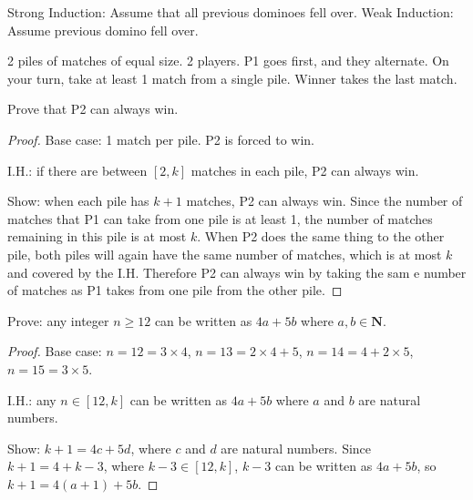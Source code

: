 \begin{remark}

Strong Induction: Assume that all previous dominoes fell over. Weak Induction: Assume previous domino fell over.

\end{remark}

\begin{prob}

2 piles of matches of equal size. 2 players. P1 goes first, and they alternate. On your turn, take at least 1 match from a single pile. Winner takes the last match.

Prove that P2 can always win.

\end{prob}

\begin{proof}

Base case: 1 match per pile. P2 is forced to win.

I.H.: if there are between $[2, k]$ matches in each pile, P2 can always win.

Show: when each pile has $k + 1$ matches, P2 can always win. Since the number of matches that P1 can take from one pile is at least 1, the number of matches remaining in this pile is at most $k$. When P2 does the same thing to the other pile, both piles will again have the same number of matches, which is at most $k$ and covered by the I.H. Therefore P2 can always win by taking the sam e number of matches as P1 takes from one pile from the other pile.

\end{proof} 

\begin{ex}

Prove: any integer $n \geq 12$ can be written as $4a + 5b$ where $a, b \in \mathbf{N}$.

\end{ex}

\begin{proof}

Base case: $n = 12 = 3 \times 4$, $n = 13 = 2 \times 4 + 5$, $n = 14 = 4 + 2 \times 5$, $n = 15 = 3 \times 5$.

I.H.: any $n \in [12, k]$ can be written as $4a + 5b$ where $a$ and $b$ are natural numbers.

Show: $k + 1 = 4c + 5d$, where $c$ and $d$ are natural numbers. Since $k + 1 = 4 + k - 3$, where $k - 3 \in [12, k]$, $k - 3$ can be written as $4a + 5b$, so $k + 1 = 4(a + 1) + 5b$.

\end{proof}


